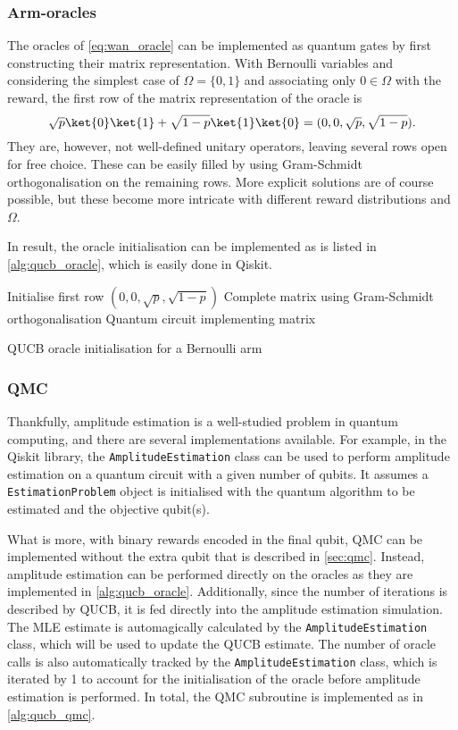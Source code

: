 \subsubsection{Arm-oracles}
The oracles of \cref{eq:wan_oracle} can be implemented as quantum gates by first constructing their matrix representation.
With Bernoulli variables and considering the simplest case of $\Omega = \{0, 1\}$ and associating only $0 \in \Omega$ with the reward, the first row of the matrix representation of the oracle is
\begin{equation}
    \sqrt{p} \ket{0} \ket{1} + \sqrt{1-p} \ket{1} \ket{0}
    =
    (0, 0, \sqrt{p}, \sqrt{1-p}).
\end{equation}
They are, however, not well-defined unitary operators, leaving several rows open for free choice.
These can be easily filled by using Gram-Schmidt orthogonalisation on the remaining rows.
More explicit solutions are of course possible, but these become more intricate with different reward distributions and $\Omega$.

In result, the oracle initialisation can be implemented as is listed in \cref{alg:qucb_oracle}, which is easily done in Qiskit.

\begin{algorithm}
    \SetAlgoLined
    Initialise first row $(0, 0, \sqrt{p}, \sqrt{1-p})$ \;
    Complete matrix using Gram-Schmidt orthogonalisation \;
    \Return Quantum circuit implementing matrix
    \caption{QUCB oracle initialisation for a Bernoulli arm}
    \label{alg:qucb_oracle}
\end{algorithm}

\subsubsection{QMC}
Thankfully, amplitude estimation is a well-studied problem in quantum computing, and there are several implementations available.
For example, in the Qiskit library, the \texttt{AmplitudeEstimation} class can be used to perform amplitude estimation on a quantum circuit with a given number of qubits.
It assumes a \texttt{EstimationProblem} object is initialised with the quantum algorithm to be estimated and the objective qubit(s).

What is more, with binary rewards encoded in the final qubit, QMC can be implemented without the extra qubit that is described in \cref{sec:qmc}.
Instead, amplitude estimation can be performed directly on the oracles as they are implemented in \cref{alg:qucb_oracle}.
Additionally, since the number of iterations is described by QUCB, it is fed directly into the amplitude estimation simulation.
The MLE estimate is automagically calculated by the \texttt{AmplitudeEstimation} class, which will be used to update the QUCB estimate.
The number of oracle calls is also automatically tracked by the \texttt{AmplitudeEstimation} class, which is iterated by 1 to account for the initialisation of the oracle before amplitude estimation is performed.
In total, the QMC subroutine is implemented as in \cref{alg:qucb_qmc}.

